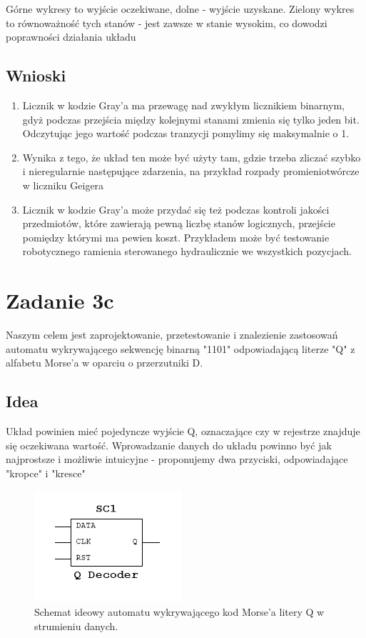 \documentclass[12pt,a4paper,table]{article}
\begin{document}
    Górne wykresy to wyjście oczekiwane, dolne - wyjście uzyskane. Zielony wykres to równoważność
    tych stanów - jest zawsze w stanie wysokim, co dowodzi poprawności działania układu

    \subsection{Wnioski}
    \begin{enumerate}
        \item Licznik w kodzie Gray'a ma przewagę nad zwykłym licznikiem binarnym, gdyż podczas przejścia
        między kolejnymi stanami zmienia się tylko jeden bit. Odczytując jego wartość podczas tranzycji
        pomylimy się maksymalnie o 1.
        \item Wynika z tego, że układ ten może być użyty tam, gdzie trzeba zliczać szybko i nieregularnie
        następujące zdarzenia, na przykład rozpady promieniotwórcze w liczniku Geigera
        \item Licznik w kodzie Gray'a może przydać się też podczas kontroli jakości przedmiotów, które
        zawierają pewną liczbę stanów logicznych, przejście pomiędzy którymi ma pewien koszt. Przykładem może być
        testowanie robotycznego ramienia sterowanego hydraulicznie we wszystkich pozycjach.
    \end{enumerate}



    \pagebreak
    \section{Zadanie 3c}
    Naszym celem jest zaprojektowanie, przetestowanie i znalezienie zastosowań automatu wykrywającego sekwencję binarną "1101" odpowiadającą
    literze "Q" z alfabetu Morse'a w oparciu o przerzutniki D.

    \subsection{Idea}
    Układ powinien mieć pojedyncze wyjście Q, oznaczające czy w rejestrze znajduje się oczekiwana wartość.
    Wprowadzanie danych do układu powinno być jak najprostsze i możliwie intuicyjne - proponujemy dwa 
    przyciski, odpowiadające "kropce" i "kresce"


    \begin{figure}[h]
        \centering
        \includegraphics[width=0.3\linewidth]{images/q_idea.PNG}
        \caption{Schemat ideowy automatu wykrywającego kod Morse'a litery Q
        w strumieniu danych.}
        \label{fig:q_idea}
    \end{figure}
\end{document}
